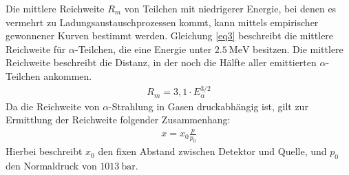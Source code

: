 \FloatBarrier
Die mittlere Reichweite $R_m$ von Teilchen mit niedrigerer Energie, bei denen es vermehrt zu Ladungsaustauschprozessen kommt, kann mittels
empirischer gewonnener Kurven bestimmt werden.
Gleichung \ref{eq3} beschreibt die mittlere Reichweite für $\alpha$-Teilchen, die eine Energie unter $\SI{2,5}{\mega \eV}$ besitzen.
Die mittlere Reichweite beschreibt die Distanz, in der noch die Hälfte aller emittierten $\alpha$-Teilchen ankommen.
\FloatBarrier
\begin{align*}
  \label{eq3}
  R_m = 3,1 \cdot E_{\alpha}^{3/2}
\end{align*}
\FloatBarrier
Da die Reichweite von $\alpha$-Strahlung in Gasen druckabhängig ist, gilt zur Ermittlung der Reichweite folgender Zusammenhang:
\begin{align*}
  x = x_0 \frac{p}{p_0}
\end{align*}
Hierbei beschreibt $x_0$ den fixen Abstand zwischen Detektor und Quelle, und $p_0$ den Normaldruck von $\SI{1013}{\bar}$.

